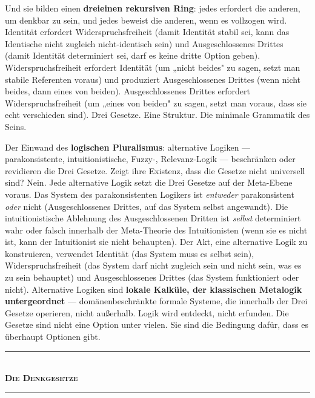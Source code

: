 \documentclass[10pt, openany, oneside]{book}
\renewcommand{\normalsize}{\fontsize{10}{13}\selectfont}
\begin{document}
Und sie bilden einen \textbf{dreieinen rekursiven Ring}: jedes erfordert die anderen, um denkbar zu sein, und jedes beweist die anderen, wenn es vollzogen wird. Identität erfordert Widerspruchsfreiheit (damit Identität stabil sei, kann das Identische nicht zugleich nicht-identisch sein) und Ausgeschlossenes Drittes (damit Identität determiniert sei, darf es keine dritte Option geben). Widerspruchsfreiheit erfordert Identität (um „nicht beides" zu sagen, setzt man stabile Referenten voraus) und produziert Ausgeschlossenes Drittes (wenn nicht beides, dann eines von beiden). Ausgeschlossenes Drittes erfordert Widerspruchsfreiheit (um „eines von beiden" zu sagen, setzt man voraus, dass sie echt verschieden sind). Drei Gesetze. Eine Struktur. Die minimale Grammatik des Seins.

Der Einwand des \textbf{logischen Pluralismus}: alternative Logiken --- parakonsistente, intuitionistische, Fuzzy-, Relevanz-Logik --- beschränken oder revidieren die Drei Gesetze. Zeigt ihre Existenz, dass die Gesetze nicht universell sind? Nein. Jede alternative Logik setzt die Drei Gesetze auf der Meta-Ebene voraus. Das System des parakonsistenten Logikers ist \textit{entweder} parakonsistent \textit{oder} nicht (Ausgeschlossenes Drittes, auf das System selbst angewandt). Die intuitionistische Ablehnung des Ausgeschlossenen Dritten ist \textit{selbst} determiniert wahr oder falsch innerhalb der Meta-Theorie des Intuitionisten (wenn sie es nicht ist, kann der Intuitionist sie nicht behaupten). Der Akt, eine alternative Logik zu konstruieren, verwendet Identität (das System muss es selbst sein), Widerspruchsfreiheit (das System darf nicht zugleich sein und nicht sein, was es zu sein behauptet) und Ausgeschlossenes Drittes (das System funktioniert oder nicht). Alternative Logiken sind \textbf{lokale Kalküle, der klassischen Metalogik untergeordnet} --- domänenbeschränkte formale Systeme, die innerhalb der Drei Gesetze operieren, nicht außerhalb. Logik wird entdeckt, nicht erfunden. Die Gesetze sind nicht eine Option unter vielen. Sie sind die Bedingung dafür, dass es überhaupt Optionen gibt.

\vspace{1.5em}


\begin{center}
    \rule{0.3\textwidth}{0.4pt}\\[0.5em]
    {\normalsize\bfseries\scshape Die Denkgesetze}\\[0.3em]
    \rule{0.3\textwidth}{0.4pt}
\end{center}
\end{document}
